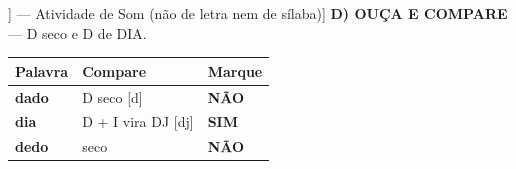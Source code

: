 \begin{exercicio}[Som /dj/ [[dZ]] --- Atividade de Som (não de letra nem de sílaba)]
\textbf{D) OUÇA E COMPARE} --- D seco e D de DIA.

\begin{center}
\begin{tabular}{@{}p{4.2cm}p{6.2cm}p{1.6cm}@{}}
\hline
\textbf{Palavra} & \textbf{Compare} & \textbf{Marque} \\
\hline
\textbf{dado} & D seco [d] & \textbf{NÃO} \\
\textbf{dia} & D + I vira DJ [dj] & \textbf{SIM} \\
\textbf{dedo} & seco & \textbf{NÃO} \\
\hline
\end{tabular}
\end{center}

\end{exercicio}

